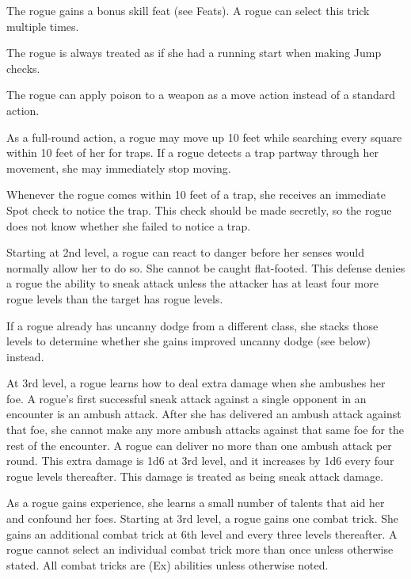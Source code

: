 The rogue gains a bonus skill feat (see Feats). A rogue can select this trick multiple times.

 The rogue is always treated as if she had a running start when making Jump checks.

 The rogue can apply poison to a weapon as a move action instead of a standard action.

 As a full-round action, a rogue may move up 10 feet while searching every square within 10 feet of her for traps. If a rogue detects a trap partway through her movement, she may immediately stop moving.

 Whenever the rogue comes within 10 feet of a trap, she receives an immediate Spot check to notice the trap. This check should be made secretly, so the rogue does not know whether she failed to notice a trap.

 Starting at 2nd level, a rogue can react to danger before her senses would normally allow her to do so. She cannot be caught flat-footed. This defense denies a rogue the ability to sneak attack unless the attacker has at least four more rogue levels than the target has rogue levels.

If a rogue already has uncanny dodge from a different class, she stacks those levels to determine whether she gains improved uncanny dodge (see below) instead.

 At 3rd level, a rogue learns how to deal extra damage when she ambushes her foe. A rogue's first successful sneak attack against a single opponent in an encounter is an ambush attack. After she has delivered an ambush attack against that foe, she cannot make any more ambush attacks against that same foe for the rest of the encounter. A rogue can deliver no more than one ambush attack per round. This extra damage is 1d6 at 3rd level, and it increases by 1d6 every four rogue levels thereafter. This damage is treated as being sneak attack damage.

 As a rogue gains experience, she learns a small number of talents that aid her and confound her foes. Starting at 3rd level, a rogue gains one combat trick. She gains an additional combat trick at 6th level and every three levels thereafter. A rogue cannot select an individual combat trick more than once unless otherwise stated. All combat tricks are (Ex) abilities unless otherwise noted.

